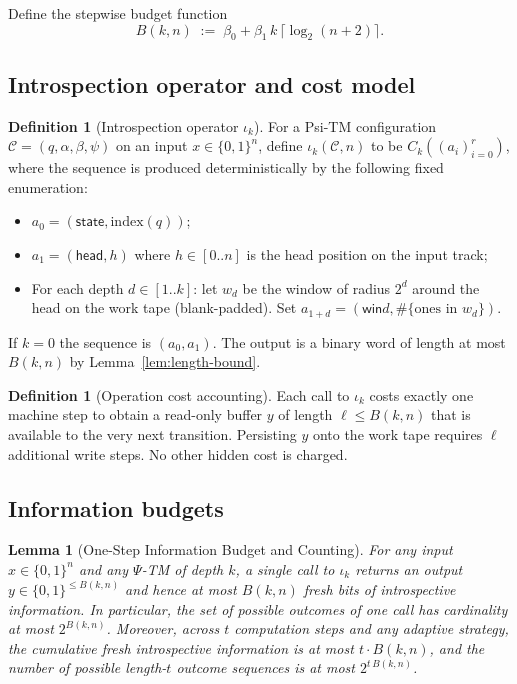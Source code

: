 \documentclass[11pt]{article}
\newtheorem{lemma}[theorem]{Lemma}
\theoremstyle{definition}
\newtheorem{definition}[theorem]{Definition}
\newcommand{\PSi}{\Psi}
\newcommand{\bits}{\{0,1\}}
\begin{document}
Define the stepwise budget function
\begin{equation}
\label{eq:budget}
B(k,n)\;:=\;\beta_0 + \beta_1\,k\,\big\lceil\log_2(n+2)\big\rceil.
\end{equation}

\subsection{Introspection operator and cost model}

\begin{definition}[Introspection operator $\iota_k$]
\label{def:iota-k}
For a Psi-TM configuration $\mathcal{C}=(q,\alpha,\beta,\psi)$ on an input $x\in\bits^n$, define $\iota_k(\mathcal{C},n)$ to be $C_k((a_i)_{i=0}^{r})$, where the sequence is produced deterministically by the following fixed enumeration:
\begin{itemize}
  \item $a_0=(\textsf{state},\mathrm{index}(q))$;
  \item $a_1=(\textsf{head},h)$ where $h\in[0..n]$ is the head position on the input track;
  \item For each depth $d\in[1..k]$: let $w_d$ be the window of radius $2^d$ around the head on the work tape (blank-padded). Set $a_{1+d}=(\textsf{win}d,\#\{\text{ones in }w_d\})$.
\end{itemize}
If $k=0$ the sequence is $(a_0,a_1)$. The output is a binary word of length at most $B(k,n)$ by Lemma~\ref{lem:length-bound}.
\end{definition}

\begin{definition}[Operation cost accounting]
\label{def:cost}
Each call to $\iota_k$ costs exactly one machine step to obtain a read-only buffer $y$ of length $\ell\le B(k,n)$ that is available to the very next transition. Persisting $y$ onto the work tape requires $\ell$ additional write steps. No other hidden cost is charged.
\end{definition}

\subsection{Information budgets}

\begin{lemma}[One-Step Information Budget and Counting]
\label{lem:one-step-budget}
For any input $x\in\bits^n$ and any $\PSi$-TM of depth $k$, a single call to $\iota_k$ returns an output $y\in\bits^{\le B(k,n)}$ and hence at most $B(k,n)$ fresh bits of introspective information. In particular, the set of possible outcomes of one call has cardinality at most $2^{B(k,n)}$. Moreover, across $t$ computation steps and any adaptive strategy, the cumulative fresh introspective information is at most $t\cdot B(k,n)$, and the number of possible length-$t$ outcome sequences is at most $2^{t\,B(k,n)}$.
\end{lemma}
\end{document}
